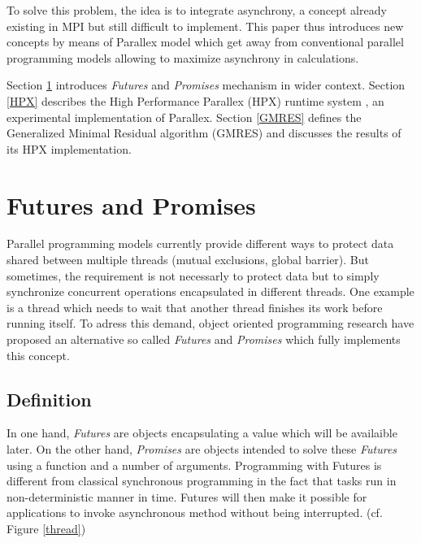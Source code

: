 \documentclass{llncs}
\begin{document}
To solve this problem, the idea is to integrate asynchrony, a concept already existing in MPI but still difficult to implement. This paper thus introduces new concepts by means of Parallex model which get away from conventional parallel programming models allowing to maximize asynchrony in calculations.\smallskip

Section \ref{Futures} introduces \emph{Futures} and \emph{Promises} mechanism in wider context. Section \ref{HPX} describes the High Performance Parallex (HPX) runtime system \cite{Parallex}, an experimental implementation of Parallex. Section \ref{GMRES} defines the Generalized Minimal Residual algorithm (GMRES) \cite{GMRES} and discusses the results of its HPX implementation.

\section{Futures and Promises}\label{Futures}
Parallel programming models currently provide different ways to protect data shared between multiple threads (mutual exclusions, global barrier). But sometimes, the requirement is not necessarly to protect data but to simply synchronize concurrent operations encapsulated in different threads. One example is a thread which needs to wait that another thread finishes its work before running itself. To adress this demand, object oriented programming research have proposed an alternative so called \emph{Futures} and \emph{Promises} \cite{Futures1} \cite{Futures2} which fully implements this concept.

\subsection{Definition}
In one hand, \emph{Futures} are objects encapsulating a value which will be availaible later. On the other hand, \emph{Promises} are objects intended to solve these \emph{Futures} using a function and a number of arguments. Programming with Futures is different from classical synchronous programming in the fact that tasks run in non-deterministic manner in time. Futures will then make it possible for applications to invoke asynchronous method without being interrupted. (cf. Figure \ref{thread})
\end{document}
